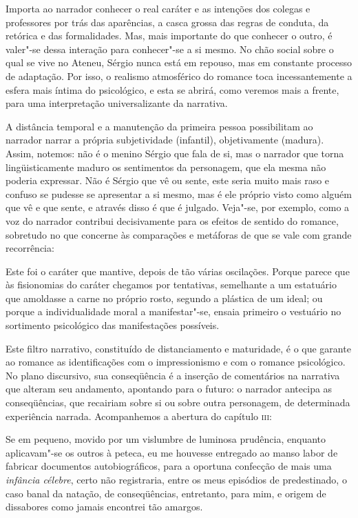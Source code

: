 Importa ao narrador conhecer o real caráter e as intenções dos colegas e
professores por trás das aparências, a casca grossa das regras de
conduta, da retórica e das formalidades. Mas, mais importante do que
conhecer o outro, é valer"-se dessa interação para conhecer"-se a si
mesmo. No chão social sobre o qual se vive no Ateneu, Sérgio nunca está
em repouso, mas em constante processo de adaptação. Por isso, o
realismo atmosférico do romance toca incessantemente a esfera mais
íntima do psicológico, e esta se abrirá, como veremos mais a frente,
para uma interpretação universalizante da narrativa. 

A distância temporal e a manutenção da primeira pessoa possibilitam ao
narrador narrar a própria subjetividade (infantil), objetivamente
(madura). Assim, notemos: não é o menino Sérgio que fala de si, mas o
narrador que torna lingüisticamente maduro os sentimentos da
personagem, que ela mesma não poderia expressar. Não é Sérgio que vê ou
sente, este seria muito mais raso e confuso se pudesse se apresentar a
si mesmo, mas é ele próprio visto como alguém que vê e que sente, e
através disso é que é julgado. Veja"-se, por exemplo, como a voz do
narrador contribui decisivamente para os efeitos de sentido do romance,
sobretudo no que concerne às comparações e metáforas de que se vale com
grande recorrência: 

\begin{hedraquote}
Este foi o caráter que mantive, depois de tão várias oscilações. Porque
parece que às fisionomias do caráter chegamos por tentativas,
semelhante a um estatuário que amoldasse a carne no próprio rosto,
segundo a plástica de um ideal; ou porque a individualidade moral a
manifestar"-se, ensaia primeiro o vestuário no sortimento psicológico
das manifestações possíveis. 
\end{hedraquote}

Este filtro narrativo, constituído de distanciamento e maturidade, é o
que garante ao romance as identificações com o impressionismo e com o
romance psicológico. No plano discursivo, sua conseqüência é a inserção
de comentários na narrativa que alteram seu andamento, apontando para o
futuro: o narrador antecipa as conseqüências, que recairiam sobre si ou
sobre outra personagem, de determinada experiência narrada.
Acompanhemos a abertura do capítulo \textsc{iii}:

\begin{hedraquote}
Se em pequeno, movido por um vislumbre de luminosa
prudência, enquanto aplicavam"-se os outros à peteca, eu me houvesse
entregado ao manso labor de fabricar documentos autobiográficos, para a
oportuna confecção de mais uma \textit{infância
célebre}, certo não registraria, entre os meus
episódios de predestinado, o caso banal da natação, de conseqüências,
entretanto, para mim, e origem de dissabores como jamais encontrei tão amargos.
\end{hedraquote}

